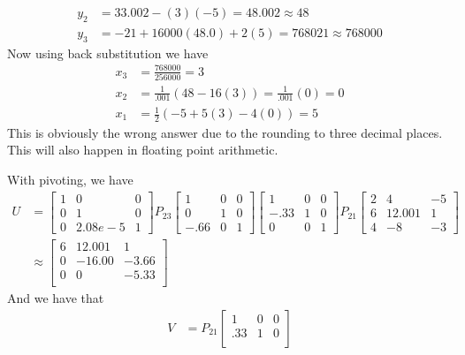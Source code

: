 \documentclass{homework}
\begin{document}
\begin{solution}
\[\begin{aligned}
      y_2 &= 33.002 - (3)(-5) = 48.002 \approx 48 \\
      y_3 &= -21 + 16000(48.0) + 2(5) = 768021 \approx 768000
    \end{aligned}
  \]
  Now using back substitution we have
  \[
    \begin{aligned}
      x_3  &= \frac{768000}{256000} = 3 \\
      x_2 &= \frac{1}{.001}(48 - 16(3)) = \frac{1}{.001}(0) = 0 \\
      x_1 &= \frac{1}{2}(-5 +5(3) - 4(0)) = 5 
    \end{aligned}
  \]
  This is obviously the wrong answer due to the rounding to three decimal places. This will also happen in floating point arithmetic.

  With pivoting, we have 
  \[
    \begin{aligned}
      U &= 
    \begin{bmatrix}
      1 & 0 & 0 \\
      0 & 1 & 0 \\
      0 & 2.08e-5 & 1
    \end{bmatrix}
    P_{23}
    \begin{bmatrix}
      1 & 0 & 0 \\
      0 & 1 & 0 \\
      -.66 & 0 & 1
    \end{bmatrix}
    \begin{bmatrix}
      1 & 0 & 0 \\
      -.33 & 1 & 0 \\
      0 & 0 & 1
    \end{bmatrix}
    P_{21}
   \begin{bmatrix}
     2 & 4 & -5 \\
     6 & 12.001 & 1 \\
     4 & -8 & -3
   \end{bmatrix} \\
   &\approx
   \begin{bmatrix}
     6 & 12.001 & 1 \\
     0 & -16.00 & -3.66 \\
     0 & 0 & -5.33 \\
   \end{bmatrix}
   \end{aligned}
  \]
  And we have that
  \[ 
    \begin{aligned}
      V &= P_{21}
    \begin{bmatrix}
      1 & 0 & 0 \\
      .33 & 1 & 0 \\

\end{bmatrix}
\end{aligned}\]
\end{solution}
\end{document}
